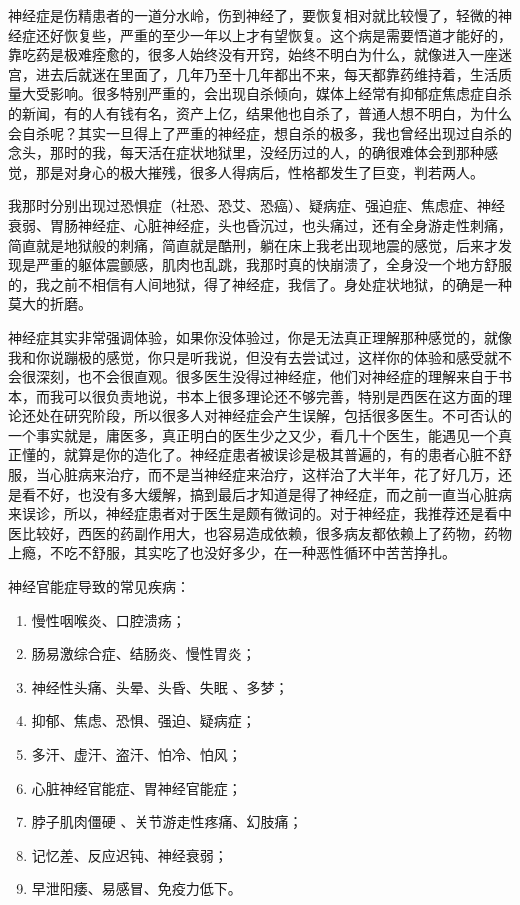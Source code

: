 \documentclass{ctexart}
\begin{document}
神经症是伤精患者的一道分水岭，伤到神经了，要恢复相对就比较慢了，轻微的神经症还好恢复些，严重的至少一年以上才有望恢复。这个病是需要悟道才能好的，靠吃药是极难痊愈的，很多人始终没有开窍，始终不明白为什么，就像进入一座迷宫，进去后就迷在里面了，几年乃至十几年都出不来，每天都靠药维持着，生活质量大受影响。很多特别严重的，会出现自杀倾向，媒体上经常有抑郁症焦虑症自杀的新闻，有的人有钱有名，资产上亿，结果他也自杀了，普通人想不明白，为什么会自杀呢？其实一旦得上了严重的神经症，想自杀的极多，我也曾经出现过自杀的念头，那时的我，每天活在症状地狱里，没经历过的人，的确很难体会到那种感觉，那是对身心的极大摧残，很多人得病后，性格都发生了巨变，判若两人。

我那时分别出现过恐惧症（社恐、恐艾、恐癌）、疑病症、强迫症、焦虑症、神经衰弱、胃肠神经症、心脏神经症，头也昏沉过，也头痛过，还有全身游走性刺痛，简直就是地狱般的刺痛，简直就是酷刑，躺在床上我老出现地震的感觉，后来才发现是严重的躯体震颤感，肌肉也乱跳，我那时真的快崩溃了，全身没一个地方舒服的，我之前不相信有人间地狱，得了神经症，我信了。身处症状地狱，的确是一种莫大的折磨。

神经症其实非常强调体验，如果你没体验过，你是无法真正理解那种感觉的，就像我和你说蹦极的感觉，你只是听我说，但没有去尝试过，这样你的体验和感受就不会很深刻，也不会很直观。很多医生没得过神经症，他们对神经症的理解来自于书本，而我可以很负责地说，书本上很多理论还不够完善，特别是西医在这方面的理论还处在研究阶段，所以很多人对神经症会产生误解，包括很多医生。不可否认的一个事实就是，庸医多，真正明白的医生少之又少，看几十个医生，能遇见一个真正懂的，就算是你的造化了。神经症患者被误诊是极其普遍的，有的患者心脏不舒服，当心脏病来治疗，而不是当神经症来治疗，这样治了大半年，花了好几万，还是看不好，也没有多大缓解，搞到最后才知道是得了神经症，而之前一直当心脏病来误诊，所以，神经症患者对于医生是颇有微词的。对于神经症，我推荐还是看中医比较好，西医的药副作用大，也容易造成依赖，很多病友都依赖上了药物，药物上瘾，不吃不舒服，其实吃了也没好多少，在一种恶性循环中苦苦挣扎。

神经官能症导致的常见疾病：

\begin{enumerate}
    \item 慢性咽喉炎、口腔溃疡；
    \item 肠易激综合症、结肠炎、慢性胃炎；
    \item 神经性头痛、头晕、头昏、失眠 、多梦；
    \item 抑郁、焦虑、恐惧、强迫、疑病症；
    \item 多汗、虚汗、盗汗、怕冷、怕风；
    \item 心脏神经官能症、胃神经官能症；
    \item 脖子肌肉僵硬 、关节游走性疼痛、幻肢痛；
    \item 记忆差、反应迟钝、神经衰弱；
    \item 早泄阳痿、易感冒、免疫力低下。
\end{enumerate}
\end{document}
